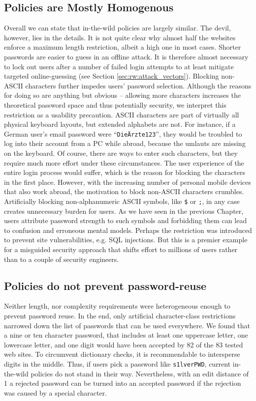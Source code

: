 \subsection{Policies are Mostly Homogenous}
Overall we can state that in-the-wild policies are largely similar. The devil, however, lies in the details. It is not quite clear why almost half the websites enforce a maximum length restriction, albeit a high one in most cases. Shorter passwords are easier to guess in an offline attack. It is therefore almost necessary to lock out users after a number of failed login attempts to at least mitigate targeted online-guessing (see Section \ref{sec:rw:attack_vectors}). Blocking non-ASCII characters further impedes users' password selection. Although the reasons for doing so are anything but obvious -- allowing more characters increases the theoretical password space and thus potentially security, we interpret this restriction as a usability precaution. ASCII characters are part of virtually all physical keyboard layouts, but extended alphabets are not. For instance, if a German user's email password were ``\texttt{DieÄrzte123}'', they would be troubled to log into their account from a PC while abroad, because the umlauts are missing on the keyboard. Of course, there are ways to enter such characters, but they require much more effort under these circumstances. The user experience of the entire login process would suffer, which is the reason for blocking the characters in the first place. However, with the increasing number of personal mobile devices that also work abroad, the motivation to block non-ASCII characters crumbles. Artificially blocking non-alphanumeric ASCII symbols, like \texttt{\$} or \texttt{;}, in any case creates unnecessary burden for users. As we have seen in the previous Chapter, users attribute password strength to such symbols and forbidding them can lead to confusion and erroneous mental models. Perhaps the restriction was introduced to prevent site vulnerabilities, e.g. SQL injections. But this is a premier example for a misguided security approach that shifts effort to millions of users rather than to a couple of security engineers. 

\subsection{Policies do not prevent password-reuse}
Neither length, nor complexity requirements were heterogeneous enough to prevent password reuse. In the end, only artificial character-class restrictions narrowed down the list of passwords that can be used everywhere. We found that a nine or ten character password, that includes at least one uppercase letter, one lowercase letter, and one digit would have been accepted by 82 of the 83 tested web sites. To circumvent dictionary checks, it is recommendable to intersperse digits in the middle. Thus, if users pick a password like \texttt{s1lverPWD}, current in-the-wild policies do not stand in their way. Nevertheless, with an edit distance of 1 a rejected password can be turned into an accepted password if the rejection was caused by a special character.



